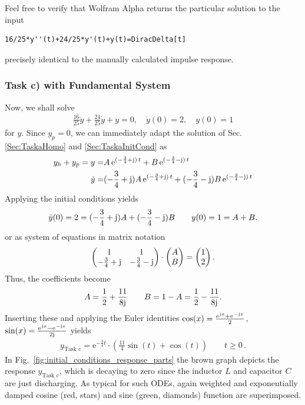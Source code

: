 \documentclass[11pt,a4paper,DIV=12]{scrartcl}
\begin{document}
Feel free to verify that Wolfram Alpha returns the particular solution to the
input
\begin{verbatim}
16/25*y''(t)+24/25*y'(t)+y(t)=DiracDelta[t]
\end{verbatim}
precisely identical to the manually calculated impulse response.



\subsubsection{Task c) with Fundamental System}
Now, we shall solve
\begin{align}
\frac{16}{25} \ddot{y} + \frac{24}{25} \dot{y} + y = 0,
\quad \dot{y}(0) = 2,\quad y(0)=1
\end{align}
for $y$.
%
Since $y_p=0$, we can immediately adapt the solution of Sec.
\ref{Sec:TaskaHomo} and \ref{Sec:TaskaInitCond} as
%
\begin{align}
y_h + y_p = y =& A \, \mathrm{e}^{(-\frac{3}{4}+\im)\,t} + B \, \mathrm{e}^{(-\frac{3}{4}-\im)\,t}\\
\dot{y} =&
(-\frac{3}{4}+\im) A \, \mathrm{e}^{(-\frac{3}{4}+\im)\,t} +
(-\frac{3}{4}-\im) B \, \mathrm{e}^{(-\frac{3}{4}-\im)\,t}
\end{align}
%
Applying the initial conditions yields
%
\begin{align}
\dot{y}(0) = 2 =
(-\frac{3}{4}+\im) A+
(-\frac{3}{4}-\im) B
\qquad
y(0) = 1 = A + B.
\end{align}
or as system of equations in matrix notation
\begin{align}
	\begin{pmatrix}
		1 & 1 \\
		-\frac{3}{4}+\im & -\frac{3}{4}-\im
	\end{pmatrix}
	\cdot
	\begin{pmatrix}
		A \\
		B
	\end{pmatrix} =
	\begin{pmatrix}
		1 \\
		2
	\end{pmatrix}. \nonumber
\end{align}
Thus, the coefficients become
\begin{align}
A = \frac{1}{2} + \frac{11}{8\im}\qquad B = 1-A = \frac{1}{2} - \frac{11}{8\im}.
\end{align}
%
Inserting these and applying the Euler identities
$\cos(x) = \frac{\e^{\im x}+\e^{-\im x}}{2}$,
$\sin(x) = \frac{\e^{\im x}-\e^{-\im x}}{2\im}$
yields
\begin{align}
\boxed{
y_\text{Task c} = \mathrm{e}^{-\frac{3}{4} t} \cdot
\left( \frac{11}{4} \sin(t) + \cos(t)\right) \qquad t\geq 0
}\,.
\end{align}
In Fig.~\ref{fig:initial_conditions_response_parts} the brown graph depicts the
response $y_\text{Task c}$, which is decaying to zero since the inductor $L$ and capacitor $C$ are
just discharging. As typical for such ODEs, again
weighted and exponentially damped cosine (red, stars) and sine (green, diamonds)
function are superimposed.
\end{document}
